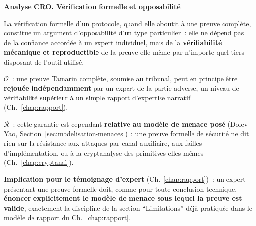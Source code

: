 \begin{boxCRO}
\textbf{Analyse CRO. Vérification formelle et opposabilité}

La vérification formelle d'un protocole, quand elle aboutit à une
preuve complète, constitue un argument d'opposabilité d'un type
particulier~: elle ne dépend pas de la confiance accordée à un
expert individuel, mais de la \textbf{vérifiabilité mécanique et
reproductible} de la preuve elle-même par n'importe quel tiers
disposant de l'outil utilisé.

$\mathcal{O}$~: une preuve Tamarin complète, soumise au tribunal,
peut en principe être \textbf{rejouée indépendamment} par un
expert de la partie adverse, un niveau de vérifiabilité supérieur
à un simple rapport d'expertise narratif (Ch.~\ref{chap:rapport}).

$\mathcal{R}$~: cette garantie est cependant \textbf{relative au
modèle de menace posé} (Dolev-Yao, Section~\ref{sec:modelisation-menaces})~:
une preuve formelle de sécurité ne dit rien sur la résistance aux
attaques par canal auxiliaire, aux failles d'implémentation, ou
à la cryptanalyse des primitives elles-mêmes (Ch.~\ref{chap:cryptanal}).


\textbf{Implication pour le témoignage d'expert}
(Ch.~\ref{chap:rapport})~: un expert présentant une preuve formelle
doit, comme pour toute conclusion technique, \textbf{énoncer
explicitement le modèle de menace sous lequel la preuve est
valide}, exactement la discipline de la section
``Limitations'' déjà pratiquée dans le modèle de rapport du
Ch.~\ref{chap:rapport}.
\end{boxCRO}

\separateur

